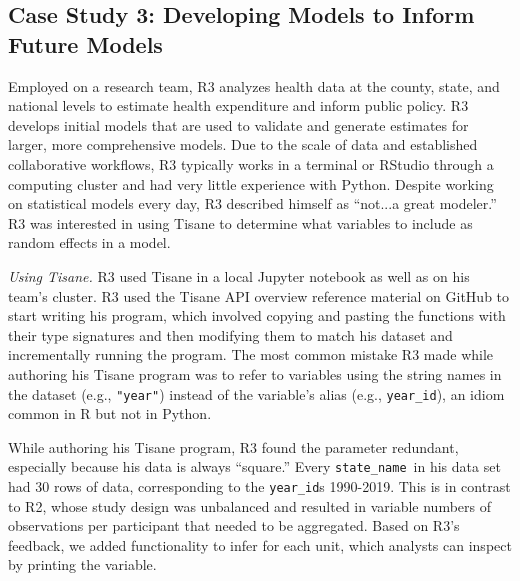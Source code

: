 \subsection{Case Study 3: Developing Models to Inform Future Models}
Employed on a research team, R3 analyzes health data at the county, state,
and national levels to estimate health expenditure and inform public policy. R3
develops initial models that are used to validate and generate estimates for
larger, more comprehensive models.
Due to the
scale of data and established collaborative workflows, R3 typically works in a
terminal or RStudio through a computing cluster and had very little experience
with Python. Despite working on statistical models every day, R3 described himself as
``not...a great modeler.''
R3 was interested in using Tisane to
determine what variables to include as random effects in a model.

\def\statename{\texttt{state\_name}\xspace}
\def\yearid{\texttt{year\_id}\xspace}
\def\cardinality{\texttt{cardinality}\xspace}

\textit{Using Tisane.} R3 used Tisane in a local Jupyter notebook as well as on
his team's cluster. R3 used the Tisane API overview reference material on GitHub
to start writing his program, which involved copying and pasting the functions
with their type signatures and then modifying them to match his dataset and
incrementally running the program. The most common mistake R3 made while
authoring his Tisane program was to refer to variables using the string names in
the dataset (e.g., \texttt{"year"}) instead of the variable's alias (e.g.,
\yearid), an idiom common in R but not in Python.

While authoring his Tisane program, R3 found the \numberofinstances parameter
redundant, especially because his data is always ``square.'' Every \statename\
in his data set had 30 rows of data, corresponding to the \yearid{}s 1990-2019.
This is in contrast to R2, whose study design was unbalanced and resulted in
variable numbers of observations per participant that needed to be aggregated. Based on R3's feedback, we
added functionality to infer \numberofinstances for each unit, which analysts can inspect by
printing the variable.

